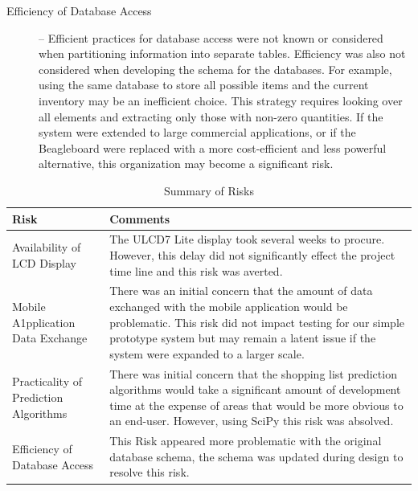 \documentclass[11pt]{article} %
\begin{document}
\begin{description}
\item[Efficiency of Database Access] -- Efficient practices for database access were not known or considered when partitioning information into separate tables. Efficiency was also not considered when developing the schema for the databases. For example, using the same database to store all possible items and the current inventory may be an inefficient choice. This strategy requires looking over all elements and extracting only those with non-zero quantities. If the system were extended to large commercial applications, or if the Beagleboard were replaced with a more cost-efficient and less powerful alternative, this organization may become a significant risk.
\end{description}

\begin{table}[h!]
\caption{Summary of Risks}
\label{tab:risksum}
\begin{center}
\begin{tabular}{|p{3cm}|p{12cm}|}
\hline
Risk & Comments \\
\hline
Availability of \newline LCD Display & The ULCD7 Lite display took several weeks to procure. However, this delay did not significantly effect the project time line and this risk was averted. \\
\hline
Mobile \newline A1pplication Data Exchange & There was an initial concern that the amount of data exchanged with the mobile application would be problematic. This risk did not impact testing for our simple prototype system but may remain a latent issue if the system were expanded to a larger scale. \\
\hline
Practicality of \newline Prediction Algorithms & There was initial concern that the shopping list prediction algorithms would take a significant amount of development time at the expense of areas that would be more obvious to an end-user. However, using SciPy this risk was absolved. \\
\hline
Efficiency of \newline Database Access & This Risk appeared more problematic with the original database schema, the schema was updated during design to resolve this risk. \\
\hline
\end{tabular}
\end{center}
\
\end{table}
\end{document}
